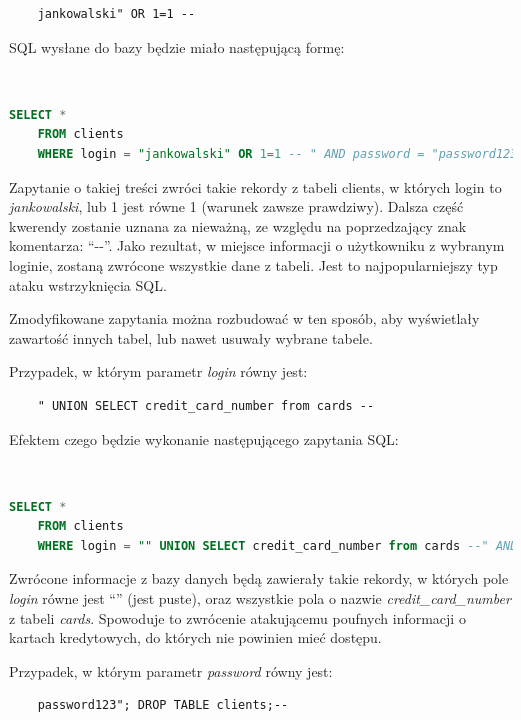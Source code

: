 \documentclass[12pt,twoside]{article}
\begin{document}
\begin{verbatim}
	jankowalski" OR 1=1 --
\end{verbatim}

SQL wysłane do bazy będzie miało następującą formę:

\

\begin{lstlisting}[language=SQL,caption=Zapytanie wysyłane do bazy po wprowadzeniu zmodyfikowanych danych,label={KodSQL4}]
	SELECT * 
	FROM clients
	WHERE login = "jankowalski" OR 1=1 -- " AND password = "password123"
\end{lstlisting}

Zapytanie o takiej treści zwróci takie rekordy z tabeli clients, w których login to \emph{jankowalski}, lub 1 jest równe 1 (warunek zawsze prawdziwy). Dalsza część kwerendy zostanie uznana za nieważną, ze względu na poprzedzający znak komentarza: ``-\--''. Jako rezultat, w miejsce informacji o użytkowniku z wybranym loginie, zostaną zwrócone wszystkie dane z tabeli. Jest to najpopularniejszy typ ataku wstrzyknięcia SQL. 

Zmodyfikowane zapytania można rozbudować w ten sposób, aby wyświetlały zawartość innych tabel, lub nawet usuwały wybrane tabele.

Przypadek, w którym parametr \emph{login} równy jest:
\begin{verbatim}
	" UNION SELECT credit_card_number from cards --
\end{verbatim}
Efektem czego będzie wykonanie następującego zapytania SQL:

\

\begin{lstlisting}[language=SQL,caption=Zmodyfikowane zapytanie zwracające wrażliwe dane,label={KodSQL5}]
	SELECT * 
	FROM clients
	WHERE login = "" UNION SELECT credit_card_number from cards --" AND password = "password123"
\end{lstlisting}

Zwrócone informacje z bazy danych będą zawierały takie rekordy, w których pole \emph{login} równe jest ``'' (jest puste), oraz wszystkie pola o nazwie \emph{credit\_card\_number} z tabeli \emph{cards}. Spowoduje to zwrócenie atakującemu poufnych informacji o kartach kredytowych, do których nie powinien mieć dostępu.

Przypadek, w którym parametr \emph{password} równy jest:

\begin{verbatim}
	password123"; DROP TABLE clients;--
\end{verbatim}
\end{document}
